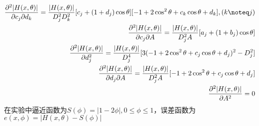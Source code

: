 \documentclass{ctexart}
\begin{document}
\begin{align}
	\frac{\partial^2{|H(x,\theta)|}}{\partial{c_j}\partial{d_k}}=\frac{|H(x,\theta)|}{D_j^2D_k^2}[c_j+(1+d_j)\cos\theta][-1+2\cos^2\theta+c_k\cos\theta+d_k],(k\noteq j)\\
	\frac{\partial^2{|H(x,\theta)|}}{\partial{c_j}\partial{A}}=\frac{|H(x,\theta)|}{D_j^2A}[a_j+(1+b_j)\cos\theta]\\
	\frac{\partial^2{|H(x,\theta)|}}{\partial{d_j^2}}=\frac{|H(x,\theta)|}{D_j^4}[3(-1+2\cos^2\theta+c_j\cos\theta+d_j)^2-D_j^2]\\
	\frac{\partial^2{|H(x,\theta)|}}{\partial{d_j}\partial{A}}=\frac{|H(x,\theta)|}{D_j^2A}[-1+2\cos^2\theta+c_j\cos\theta+d_j]\\	
	\frac{\partial^2{|H(x,\theta)|}}{\partial A^2}=0
\end{align}
在实验中逼近函数为$S(\phi) = |1-2\phi|,0\leq\phi\leq 1$，误差函数为$e(x,\phi)=|H(x,\theta)-S(\phi)|$
\end{document}
